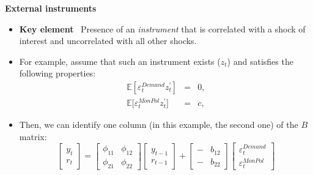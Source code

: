 \documentclass[10pt,english,t,aspectratio=169,ignorenonframetext]{beamer}
\begin{document}
\begin{frame}
{\textbf{External instruments}}\medskip

\begin{itemize}
\item \textbf{Key element} \ Presence of an \emph{instrument} that is
correlated with a shock of interest and uncorrelated with all other
shocks.\bigskip \medskip \pause

\item For example, assume that such an instrument exists ($z_{t}$) and
satisfies the following properties:%
\begin{eqnarray*}
\mathbb{E}\left[ \varepsilon _{t}^{Demand}z_{t}^{\prime }\right] &=&0, \\
\mathbb{E[}\varepsilon _{t}^{MonPol}z_{t}^{\prime }] &=&c,
\end{eqnarray*}%
\pause

\item Then, we can identify one column (in this example, the second one) of
the $B$ matrix:%
\begin{equation*}
\left[ 
\begin{array}{c}
y_{t} \\ 
r_{t}%
\end{array}%
\right] =%
\begin{bmatrix}
\phi _{11} & \phi _{12} \\ 
\phi _{21} & \phi _{22}%
\end{bmatrix}%
\left[ 
\begin{array}{c}
y_{t-1} \\ 
r_{t-1}%
\end{array}%
\right] +\left[ 
\begin{array}{cc}
- & b_{12} \\ 
- & b_{22}%
\end{array}%
\right] 
\begin{bmatrix}
\varepsilon _{t}^{Demand} \\ 
\varepsilon _{t}^{MonPol}%
\end{bmatrix}%
\end{equation*}
\end{itemize}
\end{frame}

\end{document}
